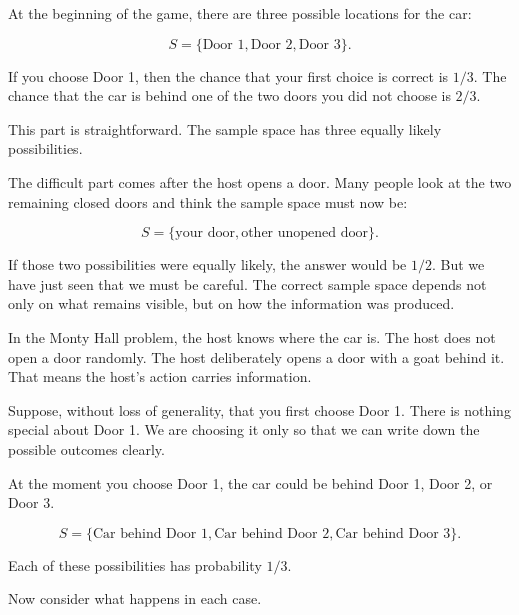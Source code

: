\documentclass[
  letterpaper,
  DIV=11,
  numbers=noendperiod]{scrreprt}
\begin{document}
At the beginning of the game, there are three possible locations for the
car:

\[
S = \{\text{Door 1}, \text{Door 2}, \text{Door 3}\}.
\]

If you choose Door 1, then the chance that your first choice is correct
is \(1/3\). The chance that the car is behind one of the two doors you
did not choose is \(2/3\).

This part is straightforward. The sample space has three equally likely
possibilities.

The difficult part comes after the host opens a door. Many people look
at the two remaining closed doors and think the sample space must now
be:

\[
S = \{\text{your door}, \text{other unopened door}\}.
\]

If those two possibilities were equally likely, the answer would be
\(1/2\). But we have just seen that we must be careful. The correct
sample space depends not only on what remains visible, but on how the
information was produced.

In the Monty Hall problem, the host knows where the car is. The host
does not open a door randomly. The host deliberately opens a door with a
goat behind it. That means the host's action carries information.

Suppose, without loss of generality, that you first choose Door 1. There
is nothing special about Door 1. We are choosing it only so that we can
write down the possible outcomes clearly.

At the moment you choose Door 1, the car could be behind Door 1, Door 2,
or Door 3.

\[
S = \{\text{Car behind Door 1}, \text{Car behind Door 2}, \text{Car behind Door 3}\}.
\]

Each of these possibilities has probability \(1/3\).

Now consider what happens in each case.
\end{document}
